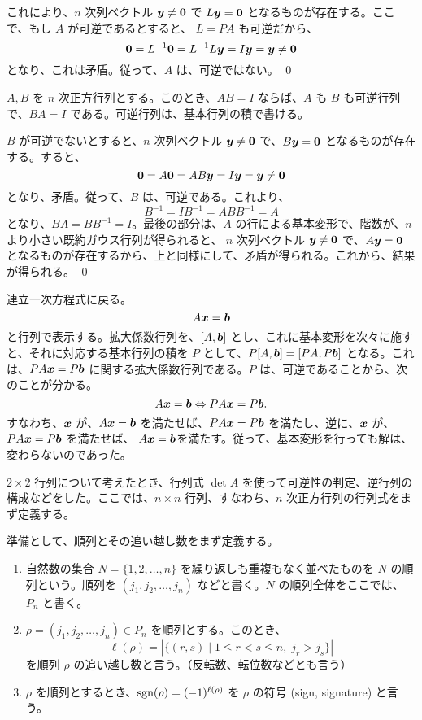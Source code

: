 これにより、$n$ 次列ベクトル $\mbox{\boldmath $y$} \neq \mbox{\boldmath $0$}$ で $L\mbox{\boldmath $y$} = \mbox{\boldmath $0$}$ となるものが存在する。ここで、もし $A$ が可逆であるとすると、
$L = PA$ も可逆だから、
$$\mbox{\boldmath $0$} = L^{-1}\mbox{\boldmath $0$} = L^{-1}L\mbox{\boldmath $y$} = I\mbox{\boldmath $y$} = \mbox{\boldmath $y$} \neq \mbox{\boldmath $0$}$$
となり、これは矛盾。従って、$A$ は、可逆ではない。
\qed

\begin{cor} \label{cor:invertible:elematrix}
$A,B$ を $n$ 次正方行列とする。このとき、$AB = I$ ならば、$A$ も $B$ も可逆行列で、$BA =  I$ である。可逆行列は、基本行列の積で書ける。
\end{cor}
\proof
$B$ が可逆でないとすると、$n$ 次列ベクトル $\mbox{\boldmath $y$}\neq \mbox{\boldmath $0$}$ で、$B\mbox{\boldmath $y$} = \mbox{\boldmath $0$}$ となるものが存在する。すると、
$$\mbox{\boldmath $0$} = A\mbox{\boldmath $0$} = AB\mbox{\boldmath $y$} = I\mbox{\boldmath $y$}  = \mbox{\boldmath $y$} \neq \mbox{\boldmath $0$}$$
となり、矛盾。従って、$B$ は、可逆である。これより、
$$B^{-1} = IB^{-1} = ABB^{-1} = A$$
となり、$BA = BB^{-1} = I$。最後の部分は、$A$ の行による基本変形で、階数が、$n$ より小さい既約ガウス行列が得られると、
$n$ 次列ベクトル $\mbox{\boldmath $y$}\neq \mbox{\boldmath $0$}$ で、$A\mbox{\boldmath $y$} = \mbox{\boldmath $0$}$ となるものが存在するから、上と同様にして、矛盾が得られる。これから、結果が得られる。
\qed

\medskip
連立一次方程式に戻る。
$$A\mbox{\boldmath $x$} = \mbox{\boldmath $b$}$$
と行列で表示する。拡大係数行列を、$[A, \mbox{\boldmath $b$}]$ とし、これに基本変形を次々に施すと、それに対応する基本行列の積を $P$ として、$P[A, \mbox{\boldmath $b$}] = [PA, P\mbox{\boldmath $b$}]$ となる。これは、$PA\mbox{\boldmath $x$} = P\mbox{\boldmath $b$}$ に関する拡大係数行列である。$P$ は、可逆であることから、次のことが分かる。
$$A\mbox{\boldmath $x$} = \mbox{\boldmath $b$} \Leftrightarrow PA\mbox{\boldmath $x$} = P\mbox{\boldmath $b$}.$$
すなわち、$\mbox{\boldmath $x$}$ が、$A\mbox{\boldmath $x$} = \mbox{\boldmath $b$}$ を満たせば、$PA\mbox{\boldmath $x$} = P\mbox{\boldmath $b$}$ を満たし、逆に、$\mbox{\boldmath $x$}$ が、$PA\mbox{\boldmath $x$} = P\mbox{\boldmath $b$}$ を満たせば、 $A\mbox{\boldmath $x$} = \mbox{\boldmath $b$}$を満たす。従って、基本変形を行っても解は、変わらないのであった。

\newpage
{}
$2\times 2$ 行列について考えたとき、行列式 $\det A$ を使って可逆性の判定、逆行列の構成などをした。ここでは、$n\times n$ 行列、すなわち、$n$ 次正方行列の行列式をまず定義する。

準備として、順列とその追い越し数をまず定義する。

\begin{definition}
\begin{enumerate}
\item 自然数の集合 $N = \{1,2,\ldots,n\}$ を繰り返しも重複もなく並べたものを $N$ の{\gt 順列}という。順列を $(j_1, j_2,\ldots,j_n)$ などと書く。$N$ の順列全体をここでは、$P_n$ と書く。
\item $\rho = (j_1,j_2,\ldots,j_n)\in P_n$ を順列とする。このとき、
$$\ell(\rho) = |\{(r,s)\mid 1\leq r < s \leq n,\;j_r > j_s\}|$$
を順列 $\rho$ の{\gt 追い越し数}と言う。（反転数、転位数などとも言う）
\item $\rho$ を順列とするとき、$\mbox{{\rm sgn}}(\rho) = (-1)^{\ell(\rho)}$ を $\rho$ の{\gt 符号} (sign, signature) と言う。
\end{enumerate}
\end{definition}

